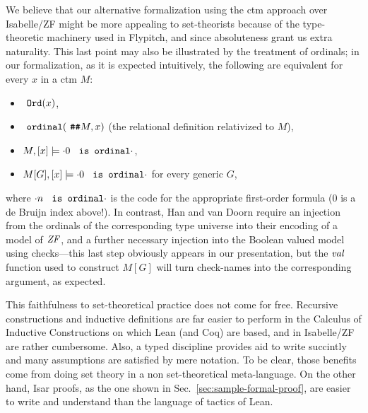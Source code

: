We believe that our alternative formalization using the ctm approach
over Isabelle/ZF might be more appealing to set-theorists because of the
type-theoretic machinery used in Flypitch, and %
since absoluteness grant us extra naturality. This last point may also
be illustrated by the treatment of ordinals; in our formalization, as
it is expected intuitively, the following are equivalent for every $x$
in a ctm $M$:
\begin{itemize}
\item $\isatt{Ord}(x)$,
\item $\isatt{ordinal}(\isatt{\#\#}M,x)$ (the relational
  definition relativized to $M$),
\item
  $M,[x] \models {\cdot}0\isatt{ is ordinal}{\cdot}$,
\item
  $M[G], [x] \models {\cdot}0\isatt{ is ordinal}{\cdot}$ for every generic $G$,
\end{itemize}
where ${\cdot}n\isatt{ is ordinal}{\cdot}$ is the code for the
appropriate first-order formula  ($0$ is a de
Bruijn index above!). In contrast, Han and van Doorn require an
injection from the ordinals of the corresponding type universe into
their encoding of a model of $\mathit{ZF}$, and a further necessary injection into the Boolean
valued model using checks---this last step obviously appears in our
presentation, but the $\operatorname{\mathit{val}}$ function used to construct $M[G]$ will turn
check-names into the corresponding argument, as expected.

This faithfulness to set-theoretical practice does not come for
free. Recursive constructions and inductive definitions are far easier
to perform in the Calculus of Inductive Constructions on which Lean
(and Coq) are based, and in Isabelle/ZF are rather cumbersome. Also, a
typed discipline provides aid to write succintly and many assumptions
are satisfied by mere notation. To be clear, those benefits come from
doing set theory in a non set-theoretical meta-language. On the other
hand, Isar proofs, as the one shown in
Sec.~\ref{sec:sample-formal-proof}, are easier to write and understand
than the language of tactics of Lean.

